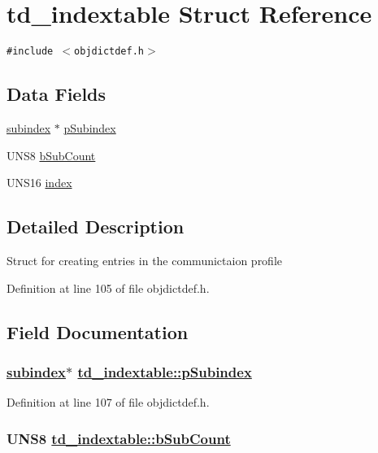 \hypertarget{structtd__indextable}{
\section{td\_\-indextable Struct Reference}
\label{structtd__indextable}
}
{\tt \#include $<$objdictdef.h$>$}

\subsection*{Data Fields}
\begin{CompactItemize}
\item 
\hyperlink{structtd__subindex}{subindex} $\ast$ \hyperlink{structtd__indextable_fdd93efce94f77d57c5778e04a6a225c}{p\-Subindex}
\item 
UNS8 \hyperlink{structtd__indextable_b0eaef21e60f3348e8928af66c2dbfcd}{b\-Sub\-Count}
\item 
UNS16 \hyperlink{structtd__indextable_1e4c3fb3d8fae2756c13bc5dad9caf0c}{index}
\end{CompactItemize}


\subsection{Detailed Description}
Struct for creating entries in the communictaion profile 



Definition at line 105 of file objdictdef.h.

\subsection{Field Documentation}
\hypertarget{structtd__indextable_fdd93efce94f77d57c5778e04a6a225c}{
\subsubsection[pSubindex]{\setlength{\rightskip}{0pt plus 5cm}\hyperlink{structtd__subindex}{subindex}$\ast$ \hyperlink{structtd__indextable_fdd93efce94f77d57c5778e04a6a225c}{td\_\-indextable::p\-Subindex}}}
\label{structtd__indextable_fdd93efce94f77d57c5778e04a6a225c}




Definition at line 107 of file objdictdef.h.\hypertarget{structtd__indextable_b0eaef21e60f3348e8928af66c2dbfcd}{
\subsubsection[bSubCount]{\setlength{\rightskip}{0pt plus 5cm}UNS8 \hyperlink{structtd__indextable_b0eaef21e60f3348e8928af66c2dbfcd}{td\_\-indextable::b\-Sub\-Count}}}
\label{structtd__indextable_b0eaef21e60f3348e8928af66c2dbfcd}




